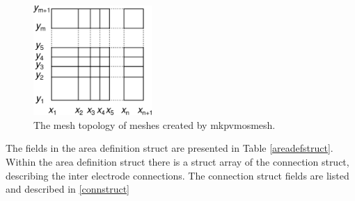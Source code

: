 \documentclass[noshowpacs,preprintnumbers,amsmath,amssymb, letter]{revtex4}
\begin{document}
\begin{figure}
\includegraphics[width=0.4\textwidth]{Octave_PVMOS_Mesh_Topology}
\caption{\label{meshtopo}The mesh topology of meshes created by mkpvmosmesh.}
\end{figure}

The fields in the area definition struct are presented in Table \ref{areadefstruct}. Within the area definition struct there is a struct array of the connection struct, describing the inter electrode connections. The connection struct fields are listed and described in \ref{connstruct}
\end{document}
